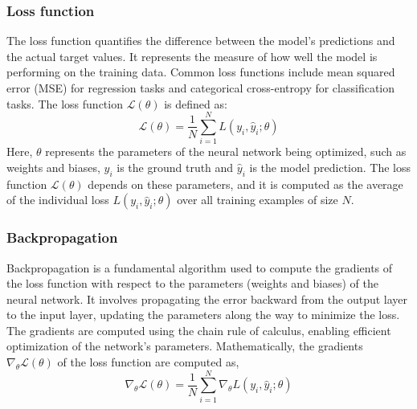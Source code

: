 \subsubsection{Loss function}
The loss function quantifies the difference between the model's predictions and the actual target values. It represents the measure of how well the model is performing on the training data. Common loss functions include mean squared error (MSE) for regression tasks and categorical cross-entropy for classification tasks. The loss function $\mathcal{L}(\theta)$ is defined as: 
\begin{equation}
    \mathcal{L}(\theta)=\frac{1}{N} \sum_{i=1}^N L\left(y_i, \hat{y}_i ; \theta\right)
    \end{equation}
Here, $\theta$ represents the parameters of the neural network being optimized, such as weights and biases, $y_i$ is the ground truth and $\hat{y}_i $ is the model prediction. The loss function $\mathcal{L}(\theta)$ depends on these parameters, and it is computed as the average of the individual loss $L\left(y_i, \hat{y}_i ; \theta\right)$ over all training examples of size $N$.
\subsubsection{Backpropagation}
Backpropagation is a fundamental algorithm used to compute the gradients of the loss function with respect to the parameters (weights and biases) of the neural network. It involves propagating the error backward from the output layer to the input layer, updating the parameters along the way to minimize the loss. The gradients are computed using the chain rule of calculus, enabling efficient optimization of the network's parameters. Mathematically, the gradients $\nabla_\theta \mathcal{L}(\theta)$ of the loss function are computed as,
\begin{equation}
    \nabla_\theta \mathcal{L}(\theta)=\frac{1}{N} \sum_{i=1}^N \nabla_\theta L\left(y_i, \hat{y}_i ; \theta\right)
    \end{equation}
